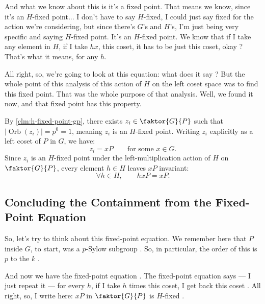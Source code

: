 \begin{proofWrapper}
\begin{speech}[00:27:23 - 00:29:23]
And what we know about this is it's a fixed point. That means we know, since it's an $H$-fixed point... I don't have to say $H$-fixed, I could just say fixed for the action we're considering, but since there's $G$'s and $H$'s, I'm just being very specific and saying $H$-fixed point. It's an $H$-fixed point. We know that if I take any element in $H$, if I take $h x$, this coset, it has to be just this coset, okay ? That's what it means, for any $h$.

All right, so, we're going to look at this equation: what does it say ? But the whole point of this analysis of this action of $H$ on the left coset space was to find this fixed point. That was the whole purpose of that analysis. Well, we found it now, and that fixed point has this property. 
\end{speech}

\begin{content}
By \cref{clm:h-fixed-point-gp}, there exists $z_i \in \faktor{G}{P}$ such that $|\operatorname{Orb}(z_i)| = p^0 = 1$, meaning $z_i$ is an $H$-fixed point. Writing $z_i$ explicitly as a left coset of $P$ in $G$, we have:
\[
z_i = x P \qquad \text{for some } x \in G.
\]
Since $z_i$ is an $H$-fixed point under the left-multiplication action of $H$ on $\faktor{G}{P}$, every element $h \in H$ leaves $x P$ invariant:
\begin{equation}\label{eq:p2-fixed-coset}
\forall h \in H, \qquad h x P = x P.
\end{equation}
\end{content}

\subsection{Concluding the Containment from the Fixed-Point Equation}

\begin{speech}[00:29:24 - 00:30:35]
So, let's try to think about this fixed-point equation. We remember here that $P$ inside $G$, to start, was a $p$-Sylow subgroup . So, in particular, the order of this is $p$ to the $k$ .

And now we have the fixed-point equation . The fixed-point equation says --- I just repeat it --- for every $h$, if I take $h$ times this coset, I get back this coset . All right, so, I write here: $x P$ in $\faktor{G}{P}$ is $H$-fixed .


\end{speech}
\end{proofWrapper}
